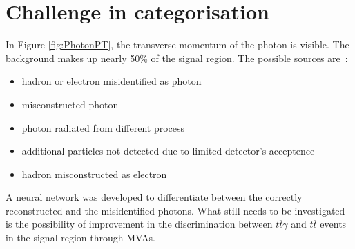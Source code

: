 \documentclass[11pt]{scrartcl}
\begin{document}
\section{Challenge in categorisation}

In Figure \ref{fig:PhotonPT}, the transverse momentum of the photon is visible. The background makes up nearly 50\% of the signal region. The possible sources are~\cite{TTG, ATLAS}:
\begin{itemize}
  \item hadron or electron misidentified as photon
  \item misconstructed photon
  \item photon radiated from different process
  \item additional particles not detected due to limited detector's acceptence
  \item hadron misconstructed as electron
\end{itemize}

A neural network was developed to differentiate between the correctly reconstructed and the misidentified photons. What still needs to be investigated is the possibility of improvement in the discrimination between $t\overline{t}\gamma$ and $t\overline{t}$ events in the signal region through MVAs.
\end{document}
